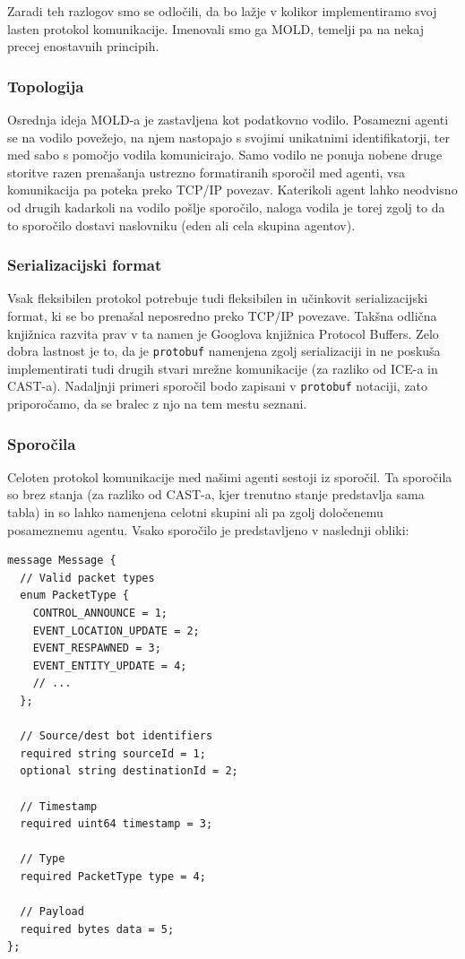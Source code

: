 \documentclass[a4paper,10pt]{article}
\begin{document}
Zaradi teh razlogov smo se odločili, da bo lažje v kolikor implementiramo svoj lasten protokol komunikacije. Imenovali smo ga MOLD, temelji pa na nekaj precej enostavnih principih.

\subsubsection{Topologija}

Osrednja ideja MOLD-a je zastavljena kot podatkovno vodilo. Posamezni agenti se na vodilo povežejo, na njem nastopajo s svojimi unikatnimi identifikatorji, ter med sabo s pomočjo vodila komunicirajo. Samo vodilo ne ponuja nobene druge storitve razen prenašanja ustrezno formatiranih sporočil med agenti, vsa komunikacija pa poteka preko TCP/IP povezav. Katerikoli agent lahko neodvisno od drugih kadarkoli na vodilo pošlje sporočilo, naloga vodila je torej zgolj to da to sporočilo dostavi naslovniku (eden ali cela skupina agentov).

\subsubsection{Serializacijski format}

Vsak fleksibilen protokol potrebuje tudi fleksibilen in učinkovit serializacijski format, ki se bo prenašal neposredno preko TCP/IP povezave. Takšna odlična knjižnica razvita prav v ta namen je Googlova knjižnica Protocol Buffers. Zelo dobra lastnost je to, da je \texttt{protobuf} namenjena zgolj serializaciji in ne poskuša implementirati tudi drugih stvari mrežne komunikacije (za razliko od ICE-a in CAST-a). Nadaljnji primeri sporočil bodo zapisani v \texttt{protobuf} notaciji, zato priporočamo, da se bralec z njo na tem mestu seznani.

\subsubsection{Sporočila}

Celoten protokol komunikacije med našimi agenti sestoji iz sporočil. Ta sporočila so brez stanja (za razliko od CAST-a, kjer trenutno stanje predstavlja sama tabla) in so lahko namenjena celotni skupini ali pa zgolj določenemu posameznemu agentu. Vsako sporočilo je predstavljeno v naslednji obliki:

\begin{verbatim}
message Message {
  // Valid packet types
  enum PacketType {
    CONTROL_ANNOUNCE = 1;
    EVENT_LOCATION_UPDATE = 2;
    EVENT_RESPAWNED = 3;
    EVENT_ENTITY_UPDATE = 4;
    // ...
  };
  
  // Source/dest bot identifiers
  required string sourceId = 1;
  optional string destinationId = 2;
  
  // Timestamp
  required uint64 timestamp = 3;
  
  // Type
  required PacketType type = 4;
  
  // Payload
  required bytes data = 5;
};
\end{verbatim}
\end{document}
